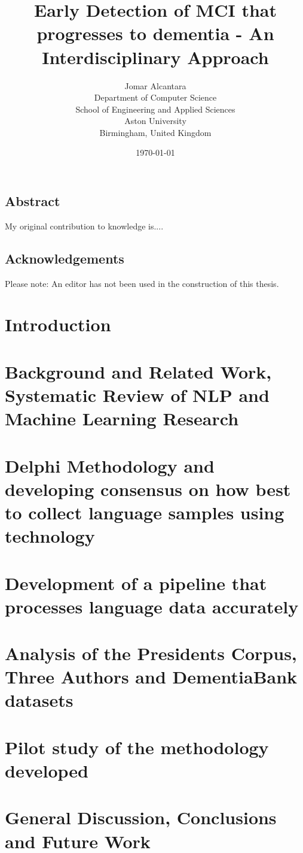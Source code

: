 \documentclass[10pt, letterpaper, twoside, openany]{thesis}
\title{Early Detection of MCI that progresses to dementia - An Interdisciplinary Approach}
\author{
        Jomar Alcantara \\
        Department of Computer Science \\
        School of Engineering and Applied Sciences \\
        Aston University\\
        Birmingham, United Kingdom
}
\date{\today}
\begin{document}
\maketitle
\newpage
\section*{Abstract}
My original contribution to knowledge is....
\newpage
\section*{Acknowledgements}
Please note: An editor has not been used in the construction of this thesis.
\newpage
\tableofcontents
\newpage
\listoffigures
\listoftables

\chapter{Introduction}


\chapter{Background and Related Work, Systematic Review of NLP and Machine Learning Research}


\chapter{Delphi Methodology and developing consensus on how best to collect language samples using technology}


\chapter{Development of a pipeline that processes language data accurately}


\chapter{Analysis of the Presidents Corpus, Three Authors and DementiaBank datasets}


\chapter{Pilot study of the methodology developed}


\chapter{General Discussion, Conclusions and Future Work}




\end{document}
